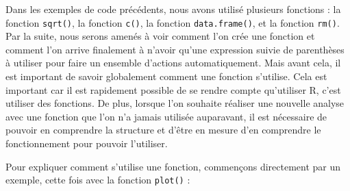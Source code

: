 \documentclass[
]{book}
\newenvironment{Shaded}{\begin{snugshade}}{\end{snugshade}}
\newcommand{\AttributeTok}[1]{\textcolor[rgb]{0.77,0.63,0.00}{#1}}
\newcommand{\FunctionTok}[1]{\textcolor[rgb]{0.00,0.00,0.00}{#1}}
\newcommand{\NormalTok}[1]{#1}
\newcommand{\SpecialCharTok}[1]{\textcolor[rgb]{0.00,0.00,0.00}{#1}}
\begin{document}
Dans les exemples de code précédents, nous avons utilisé plusieurs fonctions : la fonction \texttt{sqrt()}, la fonction \texttt{c()}, la fonction \texttt{data.frame()}, et la fonction \texttt{rm()}. Par la suite, nous serons amenés à voir comment l'on crée une fonction et comment l'on arrive finalement à n'avoir qu'une expression suivie de parenthèses à utiliser pour faire un ensemble d'actions automatiquement. Mais avant cela, il est important de savoir globalement comment une fonction s'utilise. Cela est important car il est rapidement possible de se rendre compte qu'utiliser R, c'est utiliser des fonctions. De plus, lorsque l'on souhaite réaliser une nouvelle analyse avec une fonction que l'on n'a jamais utilisée auparavant, il est nécessaire de pouvoir en comprendre la structure et d'être en mesure d'en comprendre le fonctionnement pour pouvoir l'utiliser.

Pour expliquer comment s'utilise une fonction, commençons directement par un exemple, cette fois avec la fonction \texttt{plot()} :

\begin{Shaded}
\end{Shaded}
\end{document}
